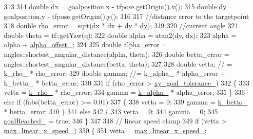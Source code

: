 \begin{DoxyCode}
{313 
314     \textcolor{keywordtype}{double} dx = goalposition.x - tfpose.getOrigin().x();
315     \textcolor{keywordtype}{double} dy = goalposition.y - tfpose.getOrigin().y();
316 
317     \textcolor{comment}{//distance error to the targetpoint}
318     \textcolor{keywordtype}{double} rho\_error = sqrt(dx * dx + dy * dy);
319 
320     \textcolor{comment}{//current angle}
321     \textcolor{keywordtype}{double} theta = tf::getYaw(q);
322     \textcolor{keywordtype}{double} alpha = atan2(dy, dx);
323     alpha = alpha + \hyperlink{classcl__move__base__z_1_1forward__local__planner_1_1ForwardLocalPlanner_a3d1b7e2ddf54efd67e4935875c7b6a67}{alpha\_offset\_};
324 
325     \textcolor{keywordtype}{double} alpha\_error = angles::shortest\_angular\_distance(alpha, theta);
326     \textcolor{keywordtype}{double} betta\_error = angles::shortest\_angular\_distance(betta, theta);
327 
328     \textcolor{keywordtype}{double} vetta; \textcolor{comment}{// = k\_rho\_ * rho\_error;}
329     \textcolor{keywordtype}{double} gamma; \textcolor{comment}{//= k\_alpha\_ * alpha\_error + k\_betta\_ * betta\_error;}
330 
331     \textcolor{keywordflow}{if} (rho\_error > \hyperlink{classcl__move__base__z_1_1forward__local__planner_1_1ForwardLocalPlanner_acd2ed91ee166f03faeeb9d6a4b91084b}{xy\_goal\_tolerance\_})
332     \{
333         vetta = \hyperlink{classcl__move__base__z_1_1forward__local__planner_1_1ForwardLocalPlanner_a8ad1b04b0bdaa8a7bb878f5e5cebd4f8}{k\_rho\_} * rho\_error;
334         gamma = \hyperlink{classcl__move__base__z_1_1forward__local__planner_1_1ForwardLocalPlanner_a530117a51f06e426b6aacc08bbd38fff}{k\_alpha\_} * alpha\_error;
335     \}
336     \textcolor{keywordflow}{else} \textcolor{keywordflow}{if} (fabs(betta\_error) >= 0.01)
337     \{
338         vetta = 0;
339         gamma = \hyperlink{classcl__move__base__z_1_1forward__local__planner_1_1ForwardLocalPlanner_a7b89ccccd288e5384154e7d5b64b4014}{k\_betta\_} * betta\_error;
340     \}
341     \textcolor{keywordflow}{else}
342     \{
343         vetta = 0;
344         gamma = 0;
345         \hyperlink{classcl__move__base__z_1_1forward__local__planner_1_1ForwardLocalPlanner_a9d51ad6f0eb364ebd830526280bdf4fc}{goalReached\_} = \textcolor{keyword}{true};
346     \}
347 
348     \textcolor{comment}{// linear speed clamp}
349     \textcolor{keywordflow}{if} (vetta > \hyperlink{classcl__move__base__z_1_1forward__local__planner_1_1ForwardLocalPlanner_ab2e354dca208a2df60e905c9ee1fcd75}{max\_linear\_x\_speed\_})
350     \{
351         vetta = \hyperlink{classcl__move__base__z_1_1forward__local__planner_1_1ForwardLocalPlanner_ab2e354dca208a2df60e905c9ee1fcd75}{max\_linear\_x\_speed\_};
}
\end{DoxyCode}
